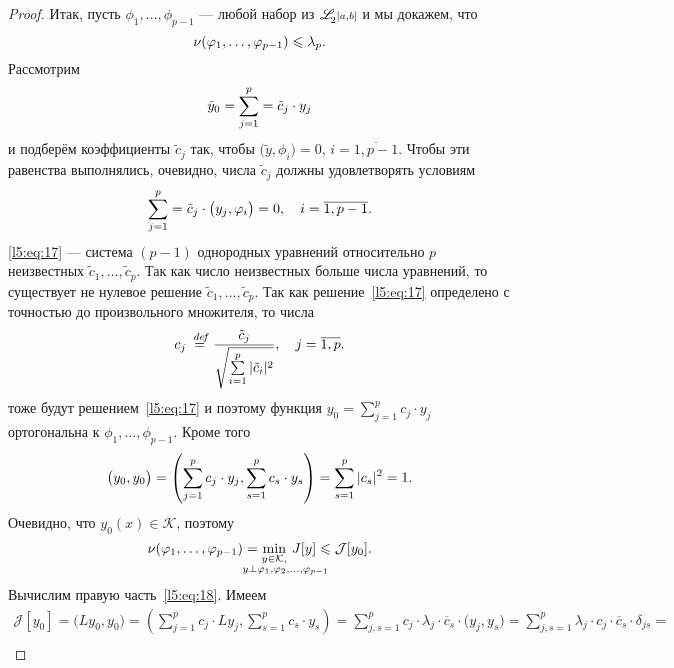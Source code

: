 \documentclass[12pt,a4paper,openany,fleqn]{book}
\newcommand {\defeq}{\stackrel{\hspace{0.09 cm}de\!f}{=}}
\newcommand {\eqdef}{\defeq}
\newcommand{\J}{\ensuremath{\mathcal{J}}}
\newcommand{\mc}[1]{\ensuremath{\mathcal{#1}}}
\newcommand{\K}{\mc{K}}
\newcommand{\fL}[1][{[a,b]}]{\ensuremath{\mathscr{L}\hspace*{-0.11 cm}{\mathstrut}_{2}{\scriptstyle#1}}}
\theoremstyle{definition}
\begin{document}
\begin{proof}
Итак, пусть $\phi_1,\ldots,\phi_{p-1}$ --- любой набор из $\fL$ и мы докажем, что
\begin{equation}
	\label{l5:eq:16}
	\hfill\nu(\phi_1,\ldots,\phi_{p-1})\leqslant\lambda_p.\hfill
\end{equation}  
Рассмотрим 
\begin{equation*}
	\hfill \tilde{y}_0=\sum\limits_{j=1}^{p}=\tilde{c}_j\cdot y_j\hfill
\end{equation*}
и подберём коэффициенты $\tilde{c}_j$ так, чтобы $\big(\tilde{y},\phi_i\big)=0,\,i=\overline{1,p-1}$. Чтобы эти равенства выполнялись, очевидно, числа $\tilde{c}_j$ должны удовлетворять условиям
\begin{equation}
	\label{l5:eq:17}
	\hfill \sum\limits_{j=1}^{p}=\tilde{c}_j\cdot \big(y_j,\phi_i\big)=0,\quad i=\overline{1,p-1}.\hfill
\end{equation} 
\eqref{l5:eq:17} --- система $(p-1)$ однородных уравнений относительно $p$ неизвестных $\tilde{c}_1,\ldots,\tilde{c}_p$. Так как число неизвестных больше числа уравнений, то существует не нулевое решение $\tilde{c}_1,\ldots,\tilde{c}_p$. Так как решение~\eqref{l5:eq:17} определено с точностью до произвольного множителя, то числа 
\begin{equation*}
	\hfill c_j\eqdef\frac{\tilde{c}_j}{\sqrt{\sum\limits_{i=1}^p|\tilde{c}_i|^2}},\quad j=\overline{1,p}.\hfill
\end{equation*}
тоже будут решением~\eqref{l5:eq:17} и поэтому функция $\displaystyle y_0=\sum\limits_{j=1}^{p}c_j\cdot y_j$ ортогональна к $\phi_1,\ldots,\phi_{p-1}$. Кроме того
\begin{equation*}
	\hfill\big(y_0,y_0\big)=\left(\sum\limits_{j=1}^{p}c_j\cdot y_j,\sum\limits_{s=1}^{p}c_s\cdot y_s\right)=\sum\limits_{s=1}^p|c_s|^2=1.\hfill
\end{equation*}
Очевидно, что $y_0(x)\in\K$, поэтому
\begin{equation}
	\label{l5:eq:18}
	\hfill\nu(\phi_1,\ldots,\phi_{p-1})=\min\limits_{\substack{y\in\K,\\\lefteqn{\scriptstyle \hspace*{-0.8cm}y\perp\phi_1,\phi_2,\ldots,\phi_{p-1}}}}\,J[y]\leqslant\J[y_0].\hfill
\end{equation} 
Вычислим правую часть~\eqref{l5:eq:18}. Имеем
\begin{multline}
	\label{l5:eq:19}
	\J[y_0]=\big(Ly_0,y_0\big)=\left(\sum\limits_{j=1}^{p}c_j\cdot Ly_j,\sum\limits_{s=1}^{p}c_s\cdot y_s\right)=\sum\limits_{j,s=1}^{p}c_j\cdot\lambda_j\cdot\overline{c}_s\cdot\big(y_j,y_s\big)=\sum\limits_{j,s=1}^{p}\lambda_j\cdot c_j\cdot\overline{c}_s\cdot\delta_{js}=\\

\end{multline}
\end{proof}
\end{document}
